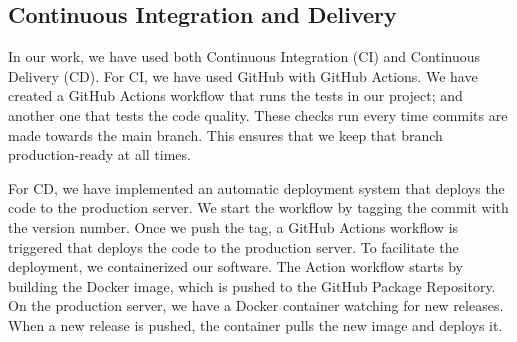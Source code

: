 \subsection{Continuous Integration and Delivery}\label{CI/CD}
In our work, we have used both Continuous Integration (CI) and Continuous Delivery (CD).
For CI, we have used GitHub with GitHub Actions. We have created a GitHub Actions workflow that
runs the tests in our project; and another one that tests the code quality. These checks run every time commits are made towards the main branch. This ensures that we keep that branch production-ready
at all times.

For CD, we have implemented an automatic deployment system that deploys the code to the production server.
We start the workflow by tagging the commit with the version number. Once we push the tag, a GitHub Actions
workflow is triggered that deploys the code to the production server.
To facilitate the deployment, we containerized our software. The Action workflow starts by building the
Docker image, which is pushed to the GitHub Package Repository. On the production server, we have a Docker 
container watching for new releases. When a new release is pushed, the container pulls the new image and
deploys it.
